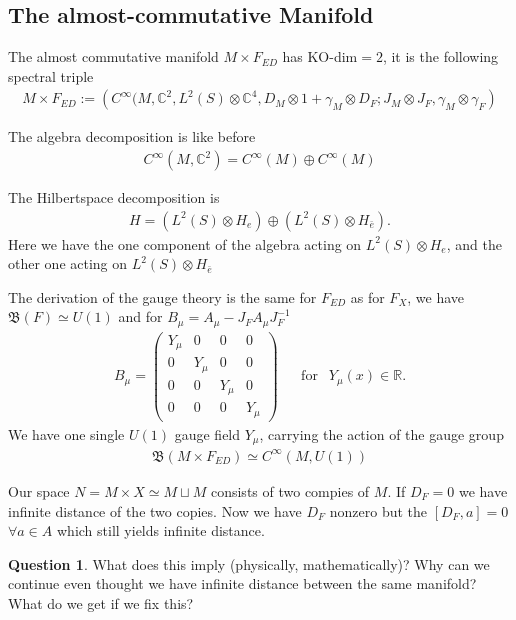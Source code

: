 \documentclass[a4paper]{article}
\theoremstyle{definition}
\theoremstyle{definition}
\newtheorem{question}{Question}
\theoremstyle{definition}
\theoremstyle{theorem}
\theoremstyle{theorem}
\theoremstyle{theorem}
\begin{document}
\subsection{The almost-commutative Manifold}
The almost commutative manifold $M\times F_{ED}$ has KO-dim$=2$, it is the
following spectral triple
\begin{align}
    M\times F_{ED} := \left(C^\infty(M,\mathbb{C}^2, L^2(S)\otimes
    \mathbb{C}^4,
    D_M\otimes 1 +\gamma _M \otimes D_F; J_M\otimes J_F, \gamma_M\otimes
    \gamma _F\right)
\end{align}

The algebra decomposition is like before
\begin{align}
    C^\infty(M, \mathbb{C}^2) = C^\infty (M) \oplus C^\infty (M)
\end{align}

The Hilbertspace decomposition is
\begin{align}
    H = (L^2(S) \otimes H_e ) \oplus (L^2(S) \otimes H_{\bar{e}}).
\end{align}
Here we have the one component of the algebra acting on $L^2(S) \otimes H_e$,
and the other one acting on $L^2(S) \otimes H_{\bar{e}}$
\newline

The derivation of the gauge theory is the same for $F_{ED}$ as for $F_X$, we
have $\mathfrak{B}(F) \simeq U(1)$ and for $B_\mu = A_\mu - J_F A_\mu
J_F^{-1}$
\begin{align}
    B_\mu =
    \begin{pmatrix}
        Y_\mu & 0 & 0 & 0 \\
        0 & Y_\mu& 0 & 0 \\
        0 & 0 & Y_\mu& 0 \\
        0 & 0 & 0 & Y_\mu
    \end{pmatrix} \;\;\;\;\;\ \text{for} \;\;\ Y_\mu (x) \in \mathbb{R}.
\end{align}
We have one single $U(1)$ gauge field $Y_\mu$, carrying the action of the
gauge group
\begin{align}
   \text{$\mathfrak{B}$}(M\times F_{ED}) \simeq C^\infty(M, U(1))
\end{align}

Our space $N = M\times X \simeq M\sqcup M$ consists of two compies of $M$.
If $D_F = 0$ we have infinite distance of the two copies. Now we have $D_F$
nonzero but the $[D_F, a] = 0$ $\forall a \in A$ which still yields infinite
distance.
\begin{question}
    What does this imply (physically, mathematically)? Why can we continue
    even thought we have infinite distance between the same manifold? What do
    we get if we fix this?
\end{question}
\end{document}
